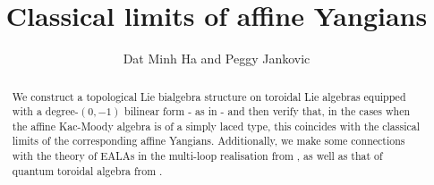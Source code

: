 

\setcounter{section}{-1}




\newcommand{\toroidal}{ \tilde{\g}_{[2]} } %
\newcommand{\extendedtoroidal}{ \hat{\g}_{[2]} } %
\renewcommand{\simpleroots}{\mathbb{I}}
\newcommand{\divzero}{\d_{[2]}}



    \title{Classical limits of affine Yangians}
    
    \author{Dat Minh Ha and Peggy Jankovic}
    \maketitle
    
    \begin{abstract}
        We construct a topological Lie bialgebra structure on toroidal Lie algebras equipped with a degree-$(0, -1)$ bilinear form - as in \cite{msc_thesis_gamma_extended_toroidal_lie_algebras} - and then verify that, in the cases when the  affine Kac-Moody algebra is of a simply laced type, this coincides with the classical limits of the corresponding affine Yangians. Additionally, we make some connections with the theory of EALAs in the multi-loop realisation from \cite{allison_berman_faulkner_pianzola_multiloop_realisation_of_EALAs}, as well as that of quantum toroidal algebra from \cite{laurie_toroidal_QUEs_coproducts_2}.
    \end{abstract}
    
    {
    \hypersetup{} 
    \tableofcontents %
    }

    

    

    
    
    \printbibliography

